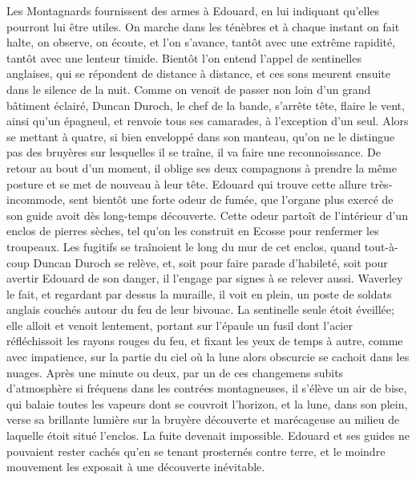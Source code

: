 Les Montagnards fournissent des armes à Edouard, en lui indiquant qu'elles pourront lui être utiles. On marche dans les ténèbres et à chaque instant on fait halte, on observe, on écoute, et l'on s'avance, tantôt avec une extrême rapidité, tantôt avec une lenteur timide. Bientôt l'on entend l'appel de sentinelles anglaises, qui se répondent de distance à distance, et ces sons meurent ensuite dans le silence de la nuit. Comme on venoit de passer non loin d'un grand bâtiment éclairé, Duncan Duroch, le chef de la bande, s'arrête\setcounter{page}{221} tête, flaire le vent, ainsi qu'un épagneul, et renvoie tous ses camarades, à l'exception d'un seul. Alors se mettant à quatre, si bien enveloppé dans son manteau, qu'on ne le distingue pas des bruyères sur lesquelles il se traîne, il va faire une reconnoissance. De retour au bout d'un moment, il oblige ses deux compagnons à prendre la même posture et se met de nouveau à leur tête. Edouard qui trouve cette allure très-incommode, sent bientôt une forte odeur de fumée, que l'organe plus exercé de son guide avoit dès long-temps découverte. Cette odeur partoît de l'intérieur d'un enclos de pierres sèches, tel qu'on les construit en Ecosse pour renfermer les troupeaux. Les fugitifs se traînoient le long du mur de cet enclos, quand tout-à-coup Duncan Duroch se relève, et, soit pour faire parade d'habileté, soit pour avertir Edouard de son danger, il l'engage par signes à se relever aussi. Waverley le fait, et regardant par dessus la muraille, il voit en plein, un poste de soldats anglais couchés autour du feu de leur bivouac. La sentinelle seule étoit éveillée; elle alloit et venoit lentement, portant sur l'épaule un fusil dont l'acier réfléchissoit les rayons rouges du feu, et fixant les yeux de temps à autre, comme\setcounter{page}{222} avec impatience, sur la partie du ciel où la lune alors obscurcie se cachoit dans les nuages.
Après une minute ou deux, par un de ces changemens subits d'atmosphère si fréquens dans les contrées montagneuses, il s'élève un air de bise, qui balaie toutes les vapeurs dont se couvroit l'horizon, et la lune, dans son plein, verse sa brillante lumière sur la bruyère découverte et marécageuse au milieu de laquelle étoit situé l'enclos.
La fuite devenait impossible. Edouard et ses guides ne pouvaient rester cachés qu'en se tenant prosternés contre terre, et le moindre mouvement les exposait à une découverte inévitable.
